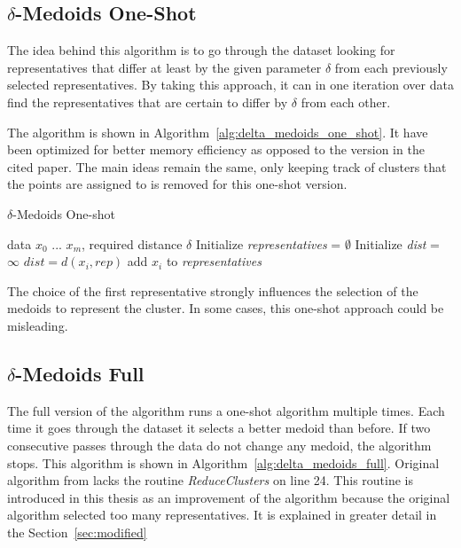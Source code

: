 \documentclass[thesis=B,english]{FITthesis}[2012/10/20]
\begin{document}
\subsection{$\delta$-Medoids One-Shot}

The idea behind this algorithm is to go through the dataset looking for representatives that differ at least by the given parameter $\delta$ from each previously selected representatives.
By taking this approach, it can in one iteration over data find the representatives that are certain to differ by $\delta$ from each other.

The algorithm is shown in Algorithm~\ref{alg:delta_medoids_one_shot}.
It have been optimized for better memory efficiency as opposed to the version in the cited paper.
The main ideas remain the same, only keeping track of clusters that the points are assigned to is removed for this one-shot version.

\begin{algorithm}
    \caption{$\delta$-Medoids One-shot}
    \label{alg:delta_medoids_one_shot}
    \begin{algorithmic}[1]
        \INPUT data $x_0$ ... $x_m$, required distance $\delta$
        \STATE Initialize \textit{representatives} = $\emptyset$
            \STATE Initialize \textit{dist} = $\infty$
                    \STATE $dist = d(x_i, rep)$
                \ENDIF
            \ENDFOR
                \STATE add $x_i$ to \textit{representatives}
            \ENDIF
        \ENDFOR
    \end{algorithmic}
\end{algorithm}


The choice of the first representative strongly influences the selection of the medoids to represent the cluster.
In some cases, this one-shot approach could be misleading.

\subsection{$\delta$-Medoids Full}

The full version of the algorithm runs a one-shot algorithm multiple times.
Each time it goes through the dataset it selects a better medoid than before.
If two consecutive passes through the data do not change any medoid, the algorithm stops.
This algorithm is shown in Algorithm~\ref{alg:delta_medoids_full}.
Original algorithm from \cite{liebman2015representative} lacks the routine \textit{ReduceClusters} on line 24.
This routine is introduced in this thesis as an improvement of the algorithm because the original algorithm selected too many representatives.
It is explained in greater detail in the Section~\ref{sec:modified}
\end{document}
